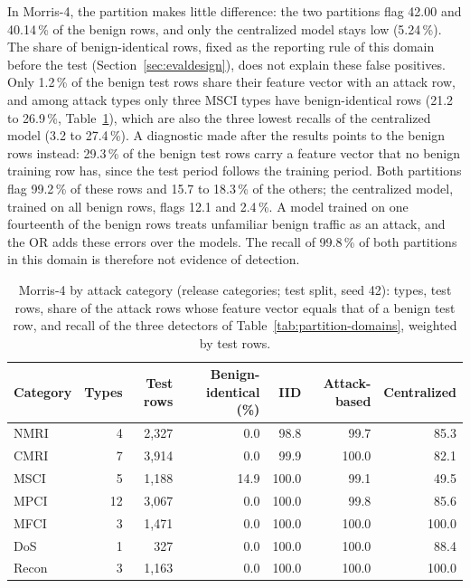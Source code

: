 In Morris-4, the partition makes little difference: the two partitions flag 42.00 and 40.14\,\% of the benign rows, and only the centralized model stays low (5.24\,\%). The share of benign-identical rows, fixed as the reporting rule of this domain before the test (Section~\ref{sec:evaldesign}), does not explain these false positives. Only 1.2\,\% of the benign test rows share their feature vector with an attack row, and among attack types only three MSCI types have benign-identical rows (21.2 to 26.9\,\%, Table~\ref{tab:morris4-categories}), which are also the three lowest recalls of the centralized model (3.2 to 27.4\,\%). A diagnostic made after the results points to the benign rows instead: 29.3\,\% of the benign test rows carry a feature vector that no benign training row has, since the test period follows the training period. Both partitions flag 99.2\,\% of these rows and 15.7 to 18.3\,\% of the others; the centralized model, trained on all benign rows, flags 12.1 and 2.4\,\%. A model trained on one fourteenth of the benign rows treats unfamiliar benign traffic as an attack, and the OR adds these errors over the models. The recall of 99.8\,\% of both partitions in this domain is therefore not evidence of detection.

\begin{table}[htbp]
\centering
\caption{Morris-4 by attack category (release categories; test split, seed 42): types, test
rows, share of the attack rows whose feature vector equals that of a benign test row, and
recall of the three detectors of Table~\ref{tab:partition-domains}, weighted by test rows.}
\label{tab:morris4-categories}
\small
\begin{tabular}{@{}lrrrrrr@{}}
\toprule
Category & Types & Test rows & Benign-identical (\%) & IID & Attack-based & Centralized \\
\midrule
NMRI  &  4 & 2,327 &  0.0 &  98.8 &  99.7 & 85.3 \\
CMRI  &  7 & 3,914 &  0.0 &  99.9 & 100.0 & 82.1 \\
MSCI  &  5 & 1,188 & 14.9 & 100.0 &  99.1 & 49.5 \\
MPCI  & 12 & 3,067 &  0.0 & 100.0 &  99.8 & 85.6 \\
MFCI  &  3 & 1,471 &  0.0 & 100.0 & 100.0 & 100.0 \\
DoS   &  1 &   327 &  0.0 & 100.0 & 100.0 & 88.4 \\
Recon &  3 & 1,163 &  0.0 & 100.0 & 100.0 & 100.0 \\
\bottomrule
\end{tabular}
\end{table}

